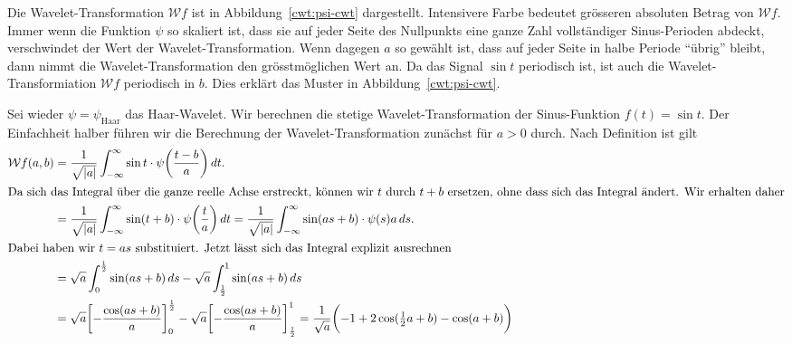 \begin{beispiel}
Die Wavelet-Transformation $\mathcal{W}f$ ist in Abbildung~\ref{cwt:psi-cwt}
dargestellt.
Intensivere Farbe bedeutet grösseren absoluten Betrag von $\mathcal{W}f$.
Immer wenn die Funktion $\psi$ so skaliert ist, dass sie auf jeder
Seite des Nullpunkts eine ganze Zahl vollständiger Sinus-Perioden abdeckt,
verschwindet der Wert der Wavelet-Transformation.
Wenn dagegen $a$ so gewählt ist, dass auf jeder Seite in halbe Periode
``übrig'' bleibt, dann nimmt die Wavelet-Transformation den grösstmöglichen
Wert an.
Da das Signal $\sin t$ periodisch ist, ist auch die Wavelet-Transformiation
$\mathcal{W}f$ periodisch in $b$.
Dies erklärt das Muster in Abbildung~\ref{cwt:psi-cwt}.
\end{beispiel}

\begin{beispiel}
Sei wieder $\psi=\psi_{\text{Haar}}$ das Haar-Wavelet.
Wir berechnen die stetige Wavelet-Transformation der Sinus-Funktion
$f(t)=\sin t$.
Der Einfachheit halber führen wir die Berechnung der Wavelet-Transformation
zunächst für $a>0$ durch.
Nach Definition ist gilt
\begin{align*}
\mathcal{W}f (a,b)
&=
\frac{1}{\sqrt{|a|}}
\int_{-\infty}^\infty \sin t\cdot \psi\biggl(\frac{t-b}{a}\biggr)\,dt.
\\
\intertext{Da sich das Integral über die ganze reelle Achse erstreckt,
können wir $t$ durch $t+b$ ersetzen, ohne dass sich das Integral ändert.
Wir erhalten daher}
&=
\frac{1}{\sqrt{|a|}}
\int_{-\infty}^\infty \sin (t+b)\cdot \psi\biggl(\frac{t}{a}\biggr)\,dt
=
\frac{1}{\sqrt{|a|}}
\int_{-\infty}^\infty \sin (as+b)\cdot \psi(s) a\,ds.
\\
\intertext{Dabei haben wir $t=as$ substituiert.
Jetzt lässt sich das Integral explizit ausrechnen}
&=
\sqrt{a}
\int_{0}^{\frac12} \sin(as+b)\,ds
-
\sqrt{a}
\int_{\frac12}^{1} \sin(as+b)\,ds
\\
&=
\sqrt{a}
\biggl[-\frac{\cos(as+b)}{a}\biggr]_{0}^{\frac12}
-
\sqrt{a}
\biggl[-\frac{\cos(as+b)}{a}\biggr]_{\frac12}^1
=
\frac{1}{\sqrt{a}}\biggl(
-1 + 2\cos({\textstyle\frac12}a+b) - \cos(a+b)
\biggr)
\end{align*}
\end{beispiel}

